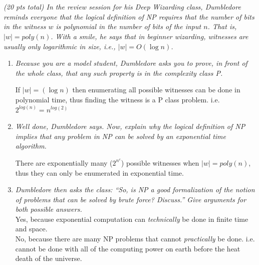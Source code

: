 \documentclass[12pt]{article} \setlength{\oddsidemargin}{0in}
\begin{document}
\section{}
\textit{(20 pts total) In the review session for his Deep Wizarding class, Dumbledore reminds everyone that the logical definition of NP requires that the number of bits in the witness $w$ is polynomial in the number of bits of the input $n$. That is, $|w| = poly(n)$. With a smile, he says that in beginner wizarding, witnesses are usually only logarithmic in size, i.e., $|w| = O(\log n)$.}
\begin{enumerate}
\item\textit{Because you are a model student, Dumbledore asks you to prove, in front of the whole class, that any such property is in the complexity class P.}

If $|w| = (\log n)$ then enumerating all possible witnesses can be done in polynomial time, thus finding the witness is a P class problem. i.e. $2^{log(n)} = n^{log(2)}$


\item\textit{Well done, Dumbledore says. Now, explain why the logical definition of NP implies that any problem in NP can be solved by an exponential time algorithm.}

There are exponentially many ($2^{n^c}$) possible witnesses when $|w| = poly(n)$, thus they can only be enumerated in exponential time. 

\item\textit{Dumbledore then asks the class: ``So, is NP a good formalization of the notion of problems that can be solved by brute force? Discuss.'' Give arguments for both possible answers.}\\

Yes, because exponential computation can \textit{technically} be done in finite time and space. \\

No, because there are many NP problems that cannot \textit{practically} be done. i.e. cannot be done with all of the computing power on earth before the heat death of the universe.

\end{enumerate}
\end{document}
